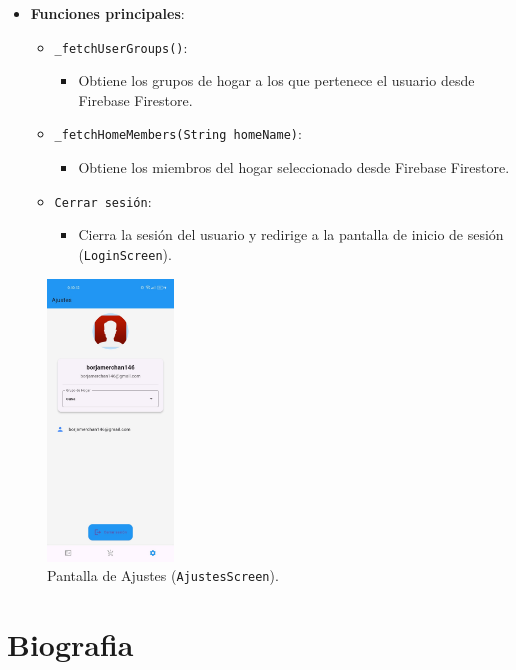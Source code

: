 \documentclass{article}
\begin{document}
\begin{flushleft}
\begin{itemize}
    \item \textbf{Funciones principales}:
    \begin{itemize}
        \item \texttt{\_fetchUserGroups()}:
        \begin{itemize}
            \item Obtiene los grupos de hogar a los que pertenece el usuario desde Firebase Firestore.
        \end{itemize}
        \item \texttt{\_fetchHomeMembers(String homeName)}:
        \begin{itemize}
            \item Obtiene los miembros del hogar seleccionado desde Firebase Firestore.
        \end{itemize}
        \item \texttt{Cerrar sesi\'on}:
        \begin{itemize}
            \item Cierra la sesi\'on del usuario y redirige a la pantalla de inicio de sesi\'on (\texttt{LoginScreen}).
        \end{itemize}
    \end{itemize}
\end{itemize}

\begin{figure}[H]
    \centering
   \includegraphics[width=0.3\textwidth]{TFG/img/img/ajustes.jpeg}
    \caption{Pantalla de Ajustes (\texttt{AjustesScreen}).}
    \label{fig:ajustes_screen}
\end{figure}

\clearpage

\section{Biografia}


\end{flushleft}
\end{document}
